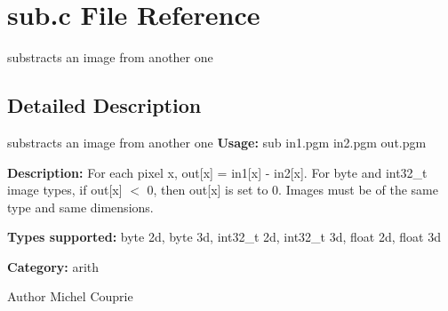 \section{sub.c File Reference}
\label{sub_8c}


substracts an image from another one  




\subsection{Detailed Description}
substracts an image from another one {\bfseries Usage:} sub in1.pgm in2.pgm out.pgm

{\bfseries Description:} For each pixel x, out[x] = in1[x] -\/ in2[x]. For byte and int32\_\-t image types, if out[x] $<$ 0, then out[x] is set to 0. Images must be of the same type and same dimensions.

{\bfseries Types supported:} byte 2d, byte 3d, int32\_\-t 2d, int32\_\-t 3d, float 2d, float 3d

{\bfseries Category:} arith

\begin{DoxyAuthor}{Author}
Michel Couprie 
\end{DoxyAuthor}
